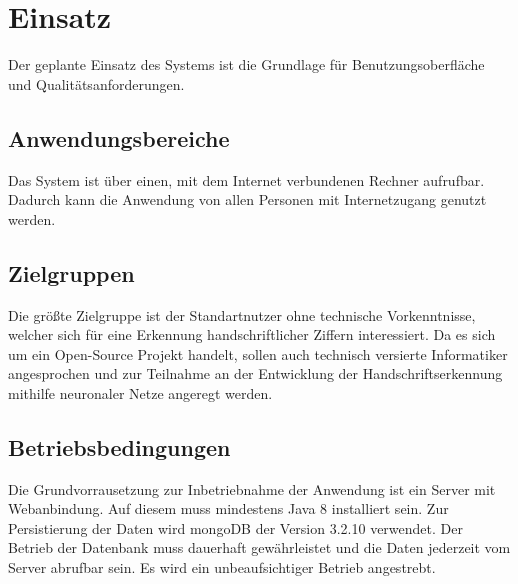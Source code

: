  \chapter{Einsatz}
Der geplante Einsatz des Systems ist die Grundlage für Benutzungsoberfläche und
Qualitätsanforderungen.
 
\section{Anwendungsbereiche}

Das System ist über einen, mit dem Internet verbundenen Rechner aufrufbar.
Dadurch kann die Anwendung von allen Personen mit Internetzugang genutzt werden.


 
\section{Zielgruppen}

Die größte Zielgruppe ist der Standartnutzer ohne technische Vorkenntnisse, welcher sich für eine Erkennung handschriftlicher Ziffern interessiert.
Da es sich um ein Open-Source Projekt handelt, sollen auch technisch versierte Informatiker angesprochen und zur Teilnahme an der Entwicklung 
der Handschriftserkennung mithilfe neuronaler Netze angeregt werden.

\section{Betriebsbedingungen}

Die Grundvorrausetzung zur Inbetriebnahme der Anwendung ist ein Server mit Webanbindung. Auf diesem muss mindestens Java 8 installiert sein.
Zur Persistierung der Daten wird mongoDB der Version 3.2.10 verwendet. Der Betrieb der Datenbank muss dauerhaft gewährleistet und die Daten
jederzeit vom Server abrufbar sein. Es wird ein unbeaufsichtiger Betrieb angestrebt. 
